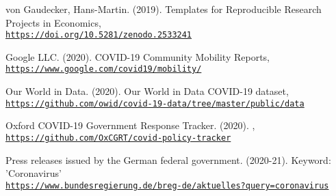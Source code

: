 \begin{thebibliography}{9}

von Gaudecker, Hans-Martin. (2019). Templates for Reproducible Research Projects in Economics,
\\\texttt{\url{https://doi.org/10.5281/zenodo.2533241}}

Google LLC. (2020). COVID-19 Community Mobility Reports,
\\\texttt{\url{https://www.google.com/covid19/mobility/}}

Our World in Data. (2020). Our World in Data COVID-19 dataset,
\\\texttt{\url{https://github.com/owid/covid-19-data/tree/master/public/data}}

Oxford COVID-19 Government Response Tracker. (2020). ,
\\\texttt{\url{https://github.com/OxCGRT/covid-policy-tracker}}

Press releases issued by the German federal government. (2020-21). Keyword: 'Coronavirus'
\\\texttt{\url{https://www.bundesregierung.de/breg-de/aktuelles?query=coronavirus}}

\end{thebibliography}